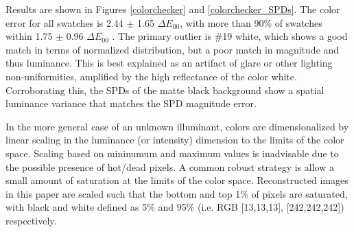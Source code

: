 \documentclass[twocolumn,10pt]{asme2ej}
\newcommand{\id}{\hspace{6 mm}}
\begin{document}
%
%
%

\id Results are shown in Figures \ref{colorchecker} and \ref{colorchecker_SPDs}. The color error for all swatches is 2.44 $\pm$ 1.65 $\Delta E_{00}$, with more than 90\% of swatches within 1.75 $\pm$ 0.96 $\Delta E_{00}$ . The primary outlier is \#19 white, which shows a good match in terms of normalized distribution, but a poor match in magnitude and thus luminance. This is best explained as an artifact of glare or other lighting non-uniformities, amplified by the high reflectance of the color white. Corroborating this, the SPDs of the matte black background show a spatial luminance variance that matches the SPD magnitude error.

\id In the more general case of an unknown illuminant, colors are dimensionalized by linear scaling in the luminance (or intensity) dimension to the limits of the color space. Scaling based on mininumum and maximum values is inadvisable due to the possible presence of hot/dead pixels. A common robust strategy is allow a small amount of saturation at the limits of the color space. Reconstructed images in this paper are scaled such that the bottom and top 1\% of pixels are saturated, with black and white defined as 5\% and 95\% (i.e. RGB [13,13,13], [242,242,242]) respectively.

%
\end{document}
